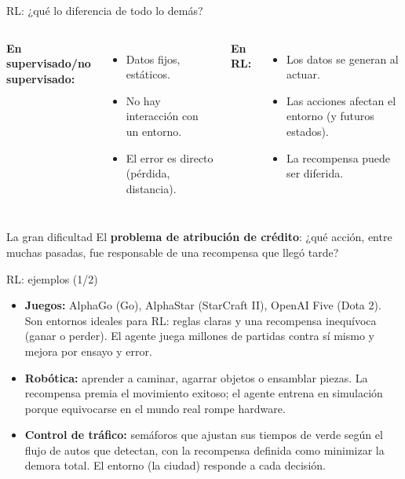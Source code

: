 \documentclass[aspectratio=169]{beamer}
\begin{document}
\begin{frame}{RL: ¿qué lo diferencia de todo lo demás?}
  \begin{columns}
      \textbf{En supervisado/no supervisado:}
      \begin{itemize}
        \item Datos fijos, estáticos.
        \item No hay interacción con un entorno.
        \item El error es directo (pérdida, distancia).
      \end{itemize}
      \textbf{En RL:}
      \begin{itemize}
        \item Los datos se generan al actuar.
        \item Las acciones afectan el entorno (y futuros estados).
        \item La recompensa puede ser diferida.
      \end{itemize}
  \end{columns}
  \bigskip
  \begin{exampleblock}{La gran dificultad}
    El \textbf{problema de atribución de crédito}: ¿qué acción, entre muchas pasadas, fue responsable de una recompensa que llegó tarde?
  \end{exampleblock}
\end{frame}

\begin{frame}{RL: ejemplos (1/2)}
  \small
  \begin{itemize}
    \item \textbf{Juegos:} AlphaGo (Go), AlphaStar (StarCraft II), OpenAI Five (Dota 2). Son entornos ideales para RL: reglas claras y una recompensa inequívoca (ganar o perder). El agente juega millones de partidas contra sí mismo y mejora por ensayo y error.
    \item \textbf{Robótica:} aprender a caminar, agarrar objetos o ensamblar piezas. La recompensa premia el movimiento exitoso; el agente entrena en simulación porque equivocarse en el mundo real rompe hardware.
    \item \textbf{Control de tráfico:} semáforos que ajustan sus tiempos de verde según el flujo de autos que detectan, con la recompensa definida como minimizar la demora total. El entorno (la ciudad) responde a cada decisión.
  \end{itemize}
\end{frame}
\end{document}
